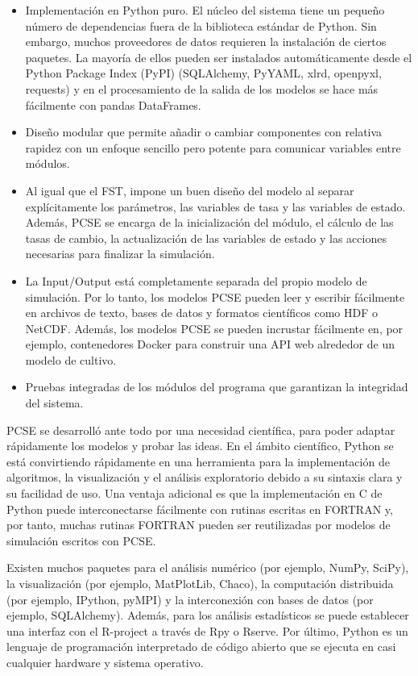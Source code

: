 \begin{itemize}
	\item Implementación en Python puro. El núcleo del sistema tiene un pequeño número de dependencias fuera de la biblioteca estándar de Python. Sin embargo, muchos proveedores de datos requieren la instalación de ciertos paquetes. La mayoría de ellos pueden ser instalados automáticamente desde el Python Package Index (PyPI) (SQLAlchemy, PyYAML, xlrd, openpyxl, requests) y en el procesamiento de la salida de los modelos se hace más fácilmente con pandas DataFrames.
	\item Diseño modular que permite añadir o cambiar componentes con relativa rapidez con un enfoque sencillo pero potente para comunicar variables entre módulos.
	\item Al igual que el FST, impone un buen diseño del modelo al separar explícitamente los parámetros, las variables de tasa y las variables de estado. Además, PCSE se encarga de la inicialización del módulo, el cálculo de las tasas de cambio, la actualización de las variables de estado y las acciones necesarias para finalizar la simulación.
	\item La Input/Output está completamente separada del propio modelo de simulación. Por lo tanto, los modelos PCSE pueden leer y escribir fácilmente en archivos de texto, bases de datos y formatos científicos como HDF o NetCDF. Además, los modelos PCSE se pueden incrustar fácilmente en, por ejemplo, contenedores Docker para construir una API web alrededor de un modelo de cultivo.
	\item Pruebas integradas de los módulos del programa que garantizan la integridad del sistema.
\end{itemize}

PCSE se desarrolló ante todo por una necesidad científica, para poder adaptar rápidamente los modelos y probar las ideas. En el ámbito científico, Python se está convirtiendo rápidamente en una herramienta para la implementación de algoritmos, la visualización y el análisis exploratorio debido a su sintaxis clara y su facilidad de uso. Una ventaja adicional es que la implementación en C de Python puede interconectarse fácilmente con rutinas escritas en FORTRAN y, por tanto, muchas rutinas FORTRAN pueden ser reutilizadas por modelos de simulación escritos con PCSE.

Existen muchos paquetes para el análisis numérico (por ejemplo, NumPy, SciPy), la visualización (por ejemplo, MatPlotLib, Chaco), la computación distribuida (por ejemplo, IPython, pyMPI) y la interconexión con bases de datos (por ejemplo, SQLAlchemy). Además, para los análisis estadísticos se puede establecer una interfaz con el  R-project a través de Rpy o Rserve. Por último, Python es un lenguaje de programación interpretado de código abierto que se ejecuta en casi cualquier hardware y sistema operativo.

